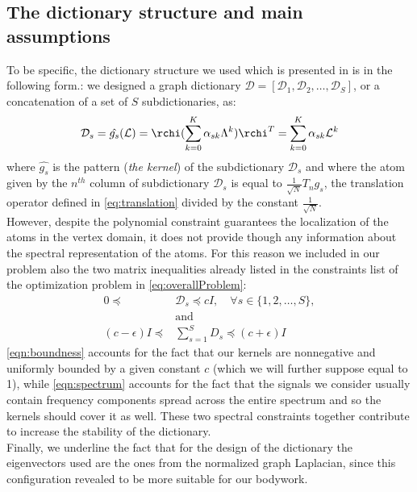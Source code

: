 \subsection{The dictionary structure and main assumptions}
To be specific, the dictionary structure we used which is presented in \cite{Thanou2014} is in the following form.: we designed a graph dictionary $\mathcal{D} = [\mathcal{D}_1, \mathcal{D}_2,\dots,\mathcal{D}_S]$, or a concatenation of a set of $S$ subdictionaries, as:
\begin{equation}
  \mathcal{D}_s = \hat{g_s}(\mathcal{L}) = \rchi (\sum_{k=0}^K \alpha_{sk}\Lambda^k)\rchi^T =   \sum_{k=0}^{K} \alpha_{sk}\mathcal{L}^k
\end{equation}
where $\hat{g_s}$ is the pattern (\textit{the kernel}) of the subdictionary $\mathcal{D}_s$ and where the atom given by the $n^{th}$ column of subdictionary $\mathcal{D}_s$ is equal to $\frac{1}{\sqrt{N}}T_ng_s$, the translation operator defined in \autoref{eq:translation} divided by the constant $\frac{1}{\sqrt{N}}$.\\
However, despite the polynomial constraint guarantees the localization of the atoms in the vertex domain, it does not provide though any information about the spectral representation of the atoms. For this reason we included in our problem also the two matrix inequalities already listed in the constraints list of the optimization problem in \ref{eq:overallProblem}:
\begin{align}
  0 \preceq \text{ } &\mathcal{D}_s \preceq cI, \quad \forall s \in \{1,2,\dots , S\},  \label{eqn:boundness}\\
  &\text{and}\\
  (c-\epsilon)I \preceq &\sum_{s=1}^{S}D_s \preceq (c+\epsilon)I \label{eqn:spectrum}
\end{align}
\autoref{eqn:boundness} accounts for the fact that our kernels are nonnegative and uniformly bounded by a given constant $c$ (which we will further suppose equal to 1), while \autoref{eqn:spectrum} accounts for the fact that the signals we consider usually contain frequency components spread across the entire spectrum and so the kernels should cover it as well. These two spectral constraints together contribute to increase the stability of the dictionary.\\

Finally, we underline the fact that for the design of the dictionary the eigenvectors used are the ones from the normalized graph Laplacian, since this configuration revealed to be more suitable for our bodywork.


